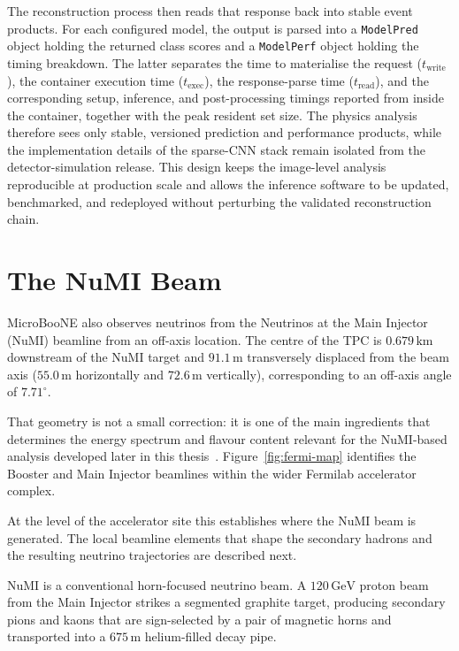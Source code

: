 The reconstruction process then reads that response back into stable event
products. For each configured model, the output is parsed into a
\texttt{ModelPred} object holding the returned class scores and a
\texttt{ModelPerf} object holding the timing breakdown. The latter separates the
time to materialise the request (\(t_{\mathrm{write}}\)), the container
execution time (\(t_{\mathrm{exec}}\)), the response-parse time
(\(t_{\mathrm{read}}\)), and the corresponding setup, inference, and
post-processing timings reported from inside the container, together with the
peak resident set size. The physics analysis therefore sees only stable,
versioned prediction and performance products, while the implementation details
of the sparse-CNN stack remain isolated from the detector-simulation release.
This design keeps the image-level analysis reproducible at production scale and
allows the inference software to be updated, benchmarked, and redeployed
without perturbing the validated reconstruction chain.

\section{The NuMI Beam}

MicroBooNE also observes neutrinos from the Neutrinos at the Main Injector
(NuMI) beamline from an off-axis location. The centre of the TPC is
\(0.679\,\mathrm{km}\) downstream of the NuMI target and
\(91.1\,\mathrm{m}\) transversely displaced from the beam axis
(\(55.0\,\mathrm{m}\) horizontally and \(72.6\,\mathrm{m}\) vertically),
corresponding to an off-axis angle of \(7.71^\circ\).

That geometry is not a
small correction: it is one of the main ingredients that determines the energy
spectrum and flavour content relevant for the NuMI-based analysis developed
later in this thesis~\cite{Abramov:2002NuMIOptics,Adamson:2016NuMIBeam,Aliaga:2016NuMIPRD}.
Figure~\ref{fig:fermi-map} identifies the Booster and Main Injector beamlines
within the wider Fermilab accelerator complex.



At the level of the accelerator site this establishes where the NuMI beam is
generated. The local beamline elements that shape the secondary hadrons and the
resulting neutrino trajectories are described next.

NuMI is a conventional horn-focused neutrino beam. A \(120\,\mathrm{GeV}\)
proton beam from the Main Injector strikes a segmented graphite target,
producing secondary pions and kaons that are sign-selected by a pair of
magnetic horns and transported into a \(675\,\mathrm{m}\) helium-filled decay
pipe.

